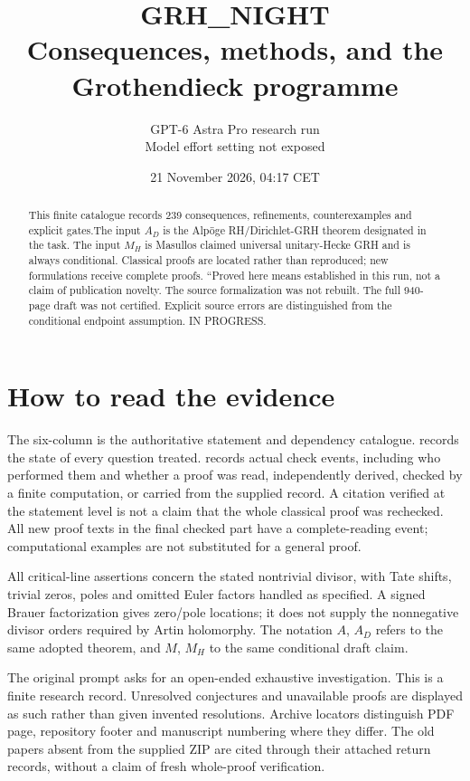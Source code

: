 \documentclass[11pt,a4paper]{article}
\title{\textbf{GRH\_NIGHT}\\Consequences, methods, and the Grothendieck programme}
\author{GPT-6 Astra Pro research run\\Model effort setting not exposed}
\date{21 November 2026, 04:\allowbreak{}17 CET}
\begin{document}
\maketitle
\begin{abstract}
This finite catalogue records 239 consequences, refinements, counterexamples and explicit gates.\allowbreak{}The input $A_D$ is the Alp\"oge RH/Dirichlet-GRH theorem designated in the task. The input $M_H$ is Masullo\textquotesingle s claimed universal unitary-Hecke GRH and is always conditional. Classical proofs are located rather than reproduced; new formulations receive complete proofs. ``Proved here means established in this run, not a claim of publication novelty. The source formalization was not rebuilt. The full 940-page draft was not certified. Explicit source errors are distinguished from the conditional endpoint assumption. IN PROGRESS.
\end{abstract}
\tableofcontents
\newpage
\section*{How to read the evidence}
The six-column  is the authoritative statement and
dependency catalogue.  records the state of every
question treated.  records actual check events,
including who performed them and whether a proof was read, independently
derived, checked by a finite computation, or carried from the supplied
record. A citation verified at the statement level is not a claim that the
whole classical proof was rechecked. All new proof texts in the final
checked part have a complete-reading event; computational examples are
not substituted for a general proof.

All critical-line assertions concern the stated nontrivial divisor, with
Tate shifts, trivial zeros, poles and omitted Euler factors handled as
specified. A signed Brauer factorization gives zero/pole locations; it
does not supply the nonnegative divisor orders required by Artin
holomorphy. The notation $A$, $A_D$ refers to the same adopted theorem,
and $M$, $M_H$ to the same conditional draft claim.

The original prompt asks for an open-ended exhaustive investigation.
This is a finite research record. Unresolved conjectures and unavailable
proofs are displayed as such rather than given invented resolutions.
Archive locators distinguish PDF page, repository footer and manuscript
numbering where they differ. The old papers absent from the supplied ZIP
are cited through their attached return records, without a claim of fresh
whole-proof verification.
\end{document}
